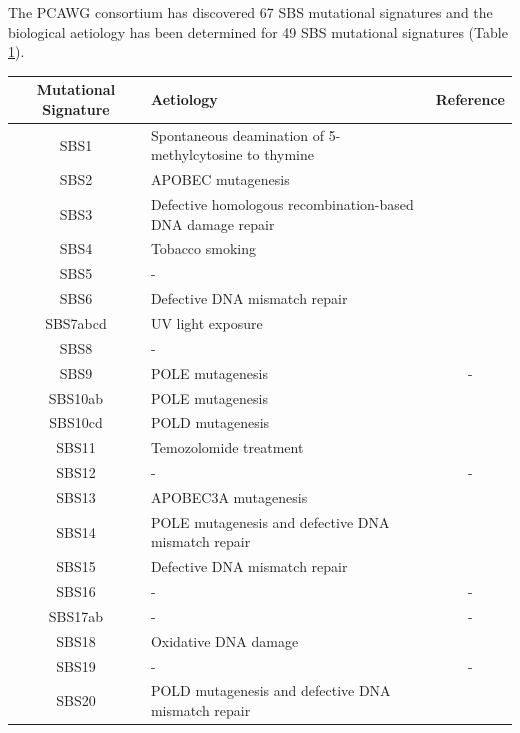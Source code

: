 The PCAWG consortium has discovered 67 SBS mutational signatures \cite{Alexandrov2020-ys} and the biological aetiology has been determined for 49 SBS mutational signatures (Table \ref{tab:pcawg-mutational-signatures}). 

\begingroup
\setlength{\LTleft}{-10cm plus -1fill} %
\setlength{\LTright}{\LTleft}
\begin{longtable}{c|p{10cm}|c}
\label{tab:pcawg-mutational-signatures} \\ \smallskip
Mutational Signature & Aetiology & Reference \\ \hline

SBS1 & Spontaneous deamination of 5-methylcytosine to thymine & \cite{Alexandrov2015-db} \\ \hline
SBS2 & APOBEC mutagenesis & \cite{Burns2013-xn} \\ \hline
SBS3 & Defective homologous recombination-based DNA damage repair & \cite{Zamborszky2017-ma} \\ \hline
SBS4 & Tobacco smoking & \cite{Alexandrov2016-uw} \\ \hline
SBS5 & - & \cite{Alexandrov2015-db} \\ \hline
SBS6 & Defective DNA mismatch repair & \cite{Meier2018-cj} \\ \hline
SBS7abcd & UV light exposure & \cite{Nik-Zainal2015-bj} \\ \hline
SBS8 & - & \\ \hline
SBS9 & POLE mutagenesis & - \\ \hline
SBS10ab & POLE mutagenesis & \cite{Robinson2021-te} \\ \hline
SBS10cd & POLD mutagenesis & \cite{Robinson2021-te} \\ \hline
SBS11 & Temozolomide treatment & \cite{Kucab2019-fy} \\ \hline
SBS12 & - & - \\ \hline
SBS13 & APOBEC3A mutagenesis & \cite{Chan2015-sk} \\ \hline
SBS14 & POLE mutagenesis and defective DNA mismatch repair & \cite{Hodel2020-je} \\ \hline
SBS15 & Defective DNA mismatch repair & \cite{Meier2018-cj} \\ \hline
SBS16 & - & - \\ \hline
SBS17ab & - & - \\ \hline
SBS18 & Oxidative DNA damage & \cite{Kucab2019-fy} \\ \hline
SBS19 & - & - \\ \hline
SBS20 & POLD mutagenesis and defective DNA mismatch repair  & \cite{Meier2018-cj} \\ \hline

\end{longtable}
